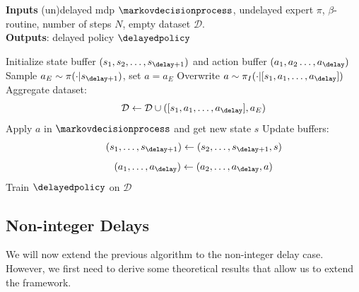 \begin{algorithm}[t] 
\caption{Delayed Imitation with \textsc{DAgger} (DIDA)}\label{algo:dida}
\textbf{Inputs}
(un)delayed \gls{mdp} $\markovdecisionprocess$, undelayed expert $\pi$, $\beta$-routine, number of steps $N$, empty dataset $\mathcal{D}$.\\
\textbf{Outputs}: delayed policy $\delayedpolicy$
\begin{algorithmic}[1]
                \STATE Initialize state buffer $( s_{1},s_{2}, \dots, s_{\delay+1})$ and action buffer $( a_{1},a_{2} \dots, a_{\delay})$
            \ENDIF
            \STATE Sample $a_E\sim\pi(\cdot\vert {{s}}_{\delay+1})$, set $a=a_E$ \label{ope:undelayed_sample}
                \STATE Overwrite ${ a \sim\pi_I(\cdot\vert [{s}_{1},a_{1}, \dots, a_{\delay}])}$ 
            \ENDIF
            \STATE Aggregate dataset:
            $$\qquad \mathcal{D}\gets \mathcal{D} \cup ([{s}_{1}, a_{1}, \dots, a_{\delay}],a_E)$$
            \STATE Apply $a$ in $\markovdecisionprocess$ and get new state $s$ 
            \STATE Update buffers:
            $$\qquad ({s}_1,\dots,{s}_{\delay+1}) \gets ({s}_2,\dots,{s}_{\delay+1},s)$$
            $$\qquad  ({a}_1,\dots,{a}_{\delay}) \gets ({a}_2,\dots,{a}_{\delay},a)$$
            \ENDFOR
        \STATE Train $\delayedpolicy$ on $\mathcal{D}$ 
    \ENDFOR
\end{algorithmic}
\end{algorithm}


\subsection{Non-integer Delays}
\label{subsec:dida_non_int}
We will now extend the previous algorithm to the non-integer delay case. 
However, we first need to derive some theoretical results that allow us to extend the framework. 


